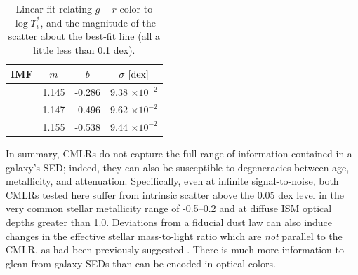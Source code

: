 \begin{table}
    \centering
    \begin{tabular}{||c|c|c|c||} \hline
        IMF & $m$ & $b$ & $\sigma~{\rm [dex]}$ \\ \hline 
        \citet{salpeter_imf_55} & 1.145 & -0.286 & 9.38 $\times 10^{-2}$ \\ \hline 
        \citet{kroupa_imf_01} & 1.147 & -0.496 & 9.62 $\times 10^{-2}$ \\ \hline 
        \citet{chabrier03} & 1.155 & -0.538 & 9.44 $\times 10^{-2}$ \\ \hline
    \end{tabular}
    \caption[Color--mass-to-light ratio relation linear fits]{\fixspacing Linear fit relating $g-r$ color to $\log \Upsilon^*_i$, and the magnitude of the scatter about the best-fit line (all a little less than 0.1 dex).}
    \label{tab:cmlr_fit}
\end{table}

In summary, CMLRs do not capture the full range of information contained in a galaxy's SED; indeed, they can also be susceptible to degeneracies between age, metallicity, and attenuation. Specifically, even at infinite signal-to-noise, both CMLRs tested here suffer from intrinsic scatter above the 0.05 dex level in the very common stellar metallicity range of -0.5--0.2 and at diffuse ISM optical depths greater than 1.0. Deviations from a fiducial dust law can also induce changes in the effective stellar mass-to-light ratio which are \emph{not} parallel to the CMLR, as had been previously suggested \citep{bell_dejong_01, bell_03}. There is much more information to glean from galaxy SEDs than can be encoded in optical colors.
